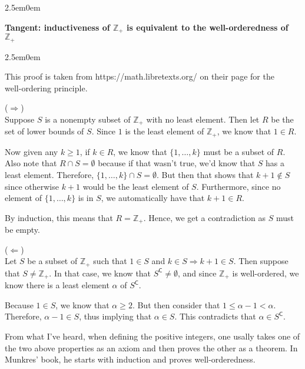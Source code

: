 \documentclass{book}
\newcommand{\myComment}{%
   \color{RawerSienna}%
   \fontsize{12}{14}\selectfont%
}
\newenvironment{myIndent}{%
   \begin{adjustwidth}{2.5em}{0em}%
}{%
   \end{adjustwidth}%
}
\newcommand{\blab}[1]{\textbf{#1}}
\newcommand{\comp}{\mathsf{C}}
\newcommand{\retTwo}{\hfill\bigbreak}
\begin{document}
   
   \begin{myIndent}\myComment
      
      {\fontsize{13}{15}\selectfont%
      \blab{Tangent: inductiveness of $\mathbb{Z}_+$ is equivalent to the well-orderedness of $\mathbb{Z}_+$}
      }
      
      \begin{myIndent}
         This proof is taken from https://math.libretexts.org/ on their page for the\\ well-ordering principle.\retTwo

         ($\Longrightarrow$)\\
         Suppose $S$ is a nonempty subset of $\mathbb{Z}_+$ with no least element. Then let $R$ be the set of lower bounds of $S$. Since $1$ is the least element of $\mathbb{Z}_+$, we know that $1 \in R$.\retTwo
         
         Now given any $k \geq 1$, if $k \in R$, we know that $\{1, \ldots, k\}$ must be a subset of $R$. Also note that $R \cap S = \emptyset$ because if that wasn't true, we'd know that $S$ has a least element. Therefore, $\{1, \ldots, k\} \cap S = \emptyset$. But then that shows that $k + 1 \notin S$ since otherwise $k + 1$ would be the least element of $S$. Furthermore, since no element of $\{1, \ldots, k\}$ is in $S$, we automatically have that $k + 1 \in R$.\retTwo

         By induction, this means that $R = \mathbb{Z}_+$. Hence, we get a contradiction as $S$ must be empty.\newpage

         ($\Longleftarrow$)\\
         Let $S$ be a subset of $\mathbb{Z}_+$ such that $1 \in S$ and $k \in S \Longrightarrow k + 1 \in S$. Then suppose that $S \neq \mathbb{Z}_+$. In that case, we know that $S^\comp \neq \emptyset$, and since $\mathbb{Z}_+$ is well-ordered, we know there is a least element $\alpha$ of $S^\comp$.\retTwo

         Because $1 \in S$, we know that $\alpha \geq 2$. But then consider that $1 \leq \alpha - 1 < \alpha$. Therefore, $\alpha - 1 \in S$, thus implying that $\alpha \in S$. This contradicts that $\alpha \in S^\comp$.\retTwo
      \end{myIndent}

      {\fontsize{13}{15}\selectfont%
      From what I've heard, when defining the positive integers, one usally takes one of the two above properties as an axiom and then proves the other as a theorem. In Munkres' book, he starts with induction and proves well-orderedness.\retTwo\retTwo
      }
   \end{myIndent}
\end{document}
